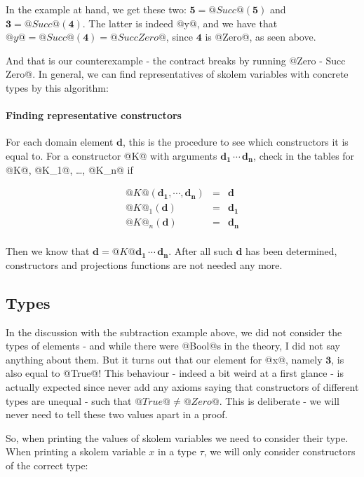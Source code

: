 In the example at hand, we get these two: $\mathbf{5} = @Succ@(\mathbf{5})$
and $\mathbf{3} = @Succ@(\mathbf{4})$. The latter is indeed @y@, and
we have that $@y@ = @Succ@(\mathbf{4}) = @Succ Zero@$, since
$\mathbf{4}$ is @Zero@, as seen above.

And that is our counterexample - the contract breaks by running
@Zero - Succ Zero@. In general, we can find representatives of
skolem variables with concrete types by this algorithm:

\paragraph{Finding representative constructors}
For each domain element $\mathbf{d}$, this is the procedure to see
which constructors it is equal to.  For a constructor @K@ with
arguments $\mathbf{d_1} \, \cdots \, \mathbf{d_n}$, check in the
tables for @K@, @K_1@, \ldots, @K_n@ if

\[\begin{array}{lcl}
@K@(\mathbf{d_1},\cdots,\mathbf{d_n}) & = & \mathbf{d}   \\
@K@_1(\mathbf{d})                    & = & \mathbf{d_1} \\
@K@_n(\mathbf{d})                    & = & \mathbf{d_n} \\
\end{array}\]

Then we know that $\mathbf{d} = @K @\mathbf{d_1} \, \cdots \, \mathbf{d_n}$.
After all such $\mathbf{d}$ has been determined, constructors and
projections functions are not needed any more.

\subsection{Types}

In the discussion with the subtraction example above, we did not
consider the types of elements - and while there were @Bool@s in the
theory, I did not say anything about them. But it turns out that our
element for @x@, namely $\mathbf{3}$, is also equal to @True@!  This
behaviour - indeed a bit weird at a first glance - is actually
expected since never add any axioms saying that constructors of
different types are unequal - such that $@True@ \neq @Zero@$. This is
deliberate - we will never need to tell these two values apart in a
proof.

So, when printing the values of skolem variables we need to consider
their type.  When printing a skolem variable $x$ in a type $\tau$,
we will only consider constructors of the correct type:


